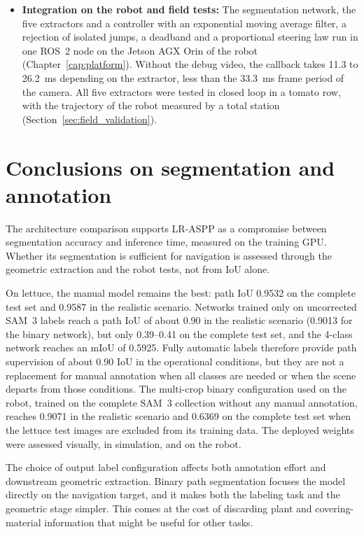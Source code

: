 \begin{itemize}
\item \textbf{Integration on the robot and field tests:} The segmentation network, the five extractors and a controller with an exponential moving average filter, a rejection of isolated jumps, a deadband and a proportional steering law run in one ROS~2 node on the Jetson AGX Orin of the robot (Chapter~\ref{cap:platform}). Without the debug video, the callback takes 11.3 to 26.2~ms depending on the extractor, less than the 33.3~ms frame period of the camera. All five extractors were tested in closed loop in a tomato row, with the trajectory of the robot measured by a total station (Section~\ref{sec:field_validation}).
\end{itemize}

\section{Conclusions on segmentation and annotation}
\label{sec:segmentation_conclusions}

The architecture comparison supports LR-ASPP as a compromise between segmentation accuracy and inference time, measured on the training GPU. Whether its segmentation is sufficient for navigation is assessed through the geometric extraction and the robot tests, not from IoU alone.

On lettuce, the manual model remains the best: path IoU 0.9532 on the complete test set and 0.9587 in the realistic scenario. Networks trained only on uncorrected SAM~3 labels reach a path IoU of about 0.90 in the realistic scenario (0.9013 for the binary network), but only 0.39--0.41 on the complete test set, and the 4-class network reaches an mIoU of 0.5925. Fully automatic labels therefore provide path supervision of about 0.90 IoU in the operational conditions, but they are not a replacement for manual annotation when all classes are needed or when the scene departs from those conditions. The multi-crop binary configuration used on the robot, trained on the complete SAM~3 collection without any manual annotation, reaches 0.9071 in the realistic scenario and 0.6369 on the complete test set when the lettuce test images are excluded from its training data. The deployed weights were assessed visually, in simulation, and on the robot.

The choice of output label configuration affects both annotation effort and downstream geometric extraction. Binary path segmentation focuses the model directly on the navigation target, and it makes both the labeling task and the geometric stage simpler. This comes at the cost of discarding plant and covering-material information that might be useful for other tasks.

